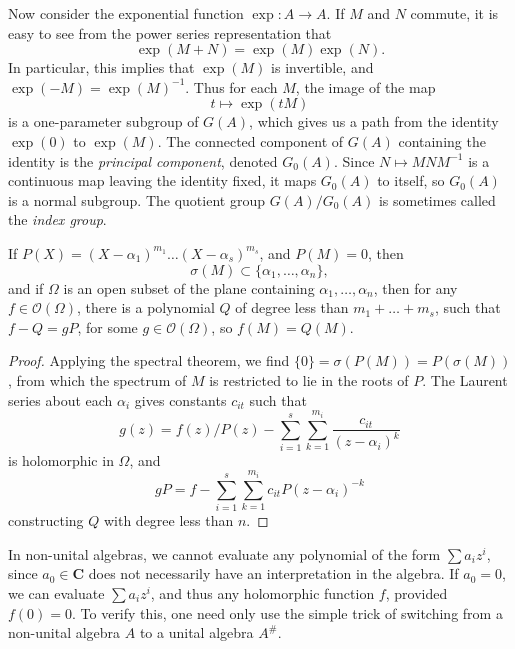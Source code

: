\begin{example}
    Now consider the exponential function $\exp: A \to A$. If $M$ and $N$ commute, it is easy to see from the power series representation that
    \[ \exp(M + N) = \exp(M) \exp(N). \]
    In particular, this implies that $\exp(M)$ is invertible, and $\exp(-M) = \exp(M)^{-1}$. Thus for each $M$, the image of the map
    \[ t \mapsto \exp(tM) \]
    is a one-parameter subgroup of $G(A)$, which gives us a path from the identity $\exp(0)$ to $\exp(M)$. The connected component of $G(A)$ containing the identity is the \emph{principal component}, denoted $G_0(A)$. Since $N \mapsto MNM^{-1}$ is a continuous map leaving the identity fixed, it maps $G_0(A)$ to itself, so $G_0(A)$ is a normal subgroup. The quotient group $G(A)/G_0(A)$ is sometimes called the \emph{index group}.
\end{example}

\begin{theorem}
    If $P(X) = (X - \alpha_1)^{m_1} \dots (X - \alpha_s)^{m_s}$, and $P(M) = 0$, then
    \[ \sigma(M) \subset \{ \alpha_1, \dots, \alpha_n \}, \]
    and if $\Omega$ is an open subset of the plane containing $\alpha_1, \dots, \alpha_n$, then for any $f \in \mathcal{O}(\Omega)$, there is a polynomial $Q$ of degree less than $m_1 + \dots + m_s$, such that $f - Q = gP$, for some $g \in \mathcal{O} (\Omega)$, so $f(M) = Q(M)$.
\end{theorem}
\begin{proof}
    Applying the spectral theorem, we find $\{ 0 \} = \sigma(P(M)) = P(\sigma(M))$, from which the spectrum of $M$ is restricted to lie in the roots of $P$. The Laurent series about each $\alpha_i$ gives constants $c_{it}$ such that
    \[ g(z) = f(z)/P(z) - \sum_{i = 1}^s \sum_{k = 1}^{m_i} \frac{c_{it}}{(z - \alpha_i)^k} \]
    is holomorphic in $\Omega$, and
    \[ gP = f - \sum_{i = 1}^s \sum_{k = 1}^{m_i} c_{it} P (z - \alpha_i)^{-k} \]
    constructing $Q$ with degree less than $n$.
\end{proof}

In non-unital algebras, we cannot evaluate any polynomial of the form $\sum a_i z^i$, since $a_0 \in \mathbf{C}$ does not necessarily have an interpretation in the algebra. If $a_0 = 0$, we can evaluate $\sum a_i z^i$, and thus any holomorphic function $f$, provided $f(0) = 0$. To verify this, one need only use the simple trick of switching from a non-unital algebra $A$ to a unital algebra $A^\#$.


